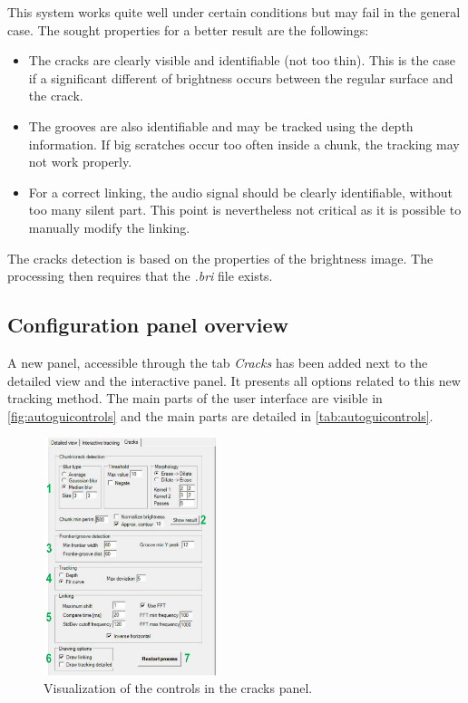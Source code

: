 This system works quite well under certain conditions but may fail in the general case. The sought properties for a better result are the followings:

\begin{itemize}
\item The cracks are clearly visible and identifiable (not too thin). This is the case if a significant different of brightness occurs between the regular surface and the crack.
\item The grooves are also identifiable and may be tracked using the depth information. If big scratches occur too often inside a chunk, the tracking may not work properly.
\item For a correct linking, the audio signal should be clearly identifiable, without too many silent part. This point is nevertheless not critical as it is possible to manually modify the linking.
\end{itemize}

The cracks detection is based on the properties of the brightness image. The processing then requires that the \emph{.bri} file exists.

\subsection{Configuration panel overview}

A new panel, accessible through the tab \emph{Cracks} has been added next to the detailed view and the interactive panel. It presents all options related to this new tracking method. The main parts of the user interface are visible in \autoref{fig:autoguicontrols} and the main parts are detailed in \autoref{tab:autoguicontrols}.

\begin{figure}[!ht]
\centering
\includegraphics[width=0.45\textwidth]{images/auto-track-controls}
\caption{Visualization of the controls in the cracks panel.}
\label{fig:autoguicontrols}
\end{figure}


